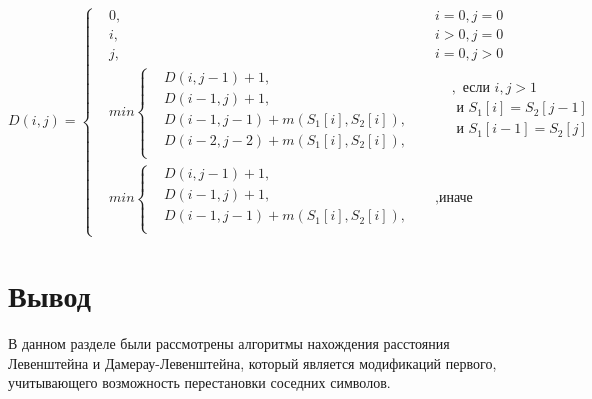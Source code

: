 \[ D(i, j) =  \left\{
    \begin{aligned}
        &0, && i = 0, j = 0\\
        &i, && i > 0, j = 0\\
        &j, && i = 0, j > 0\\
        &min \left\{
            \begin{aligned}
                &D(i, j - 1) + 1,\\
                &D(i - 1, j) + 1,\\
                &D(i - 1, j - 1) + m(S_{1}[i], S_{2}[i]), \\
                &D(i - 2, j - 2) + m(S_{1}[i], S_{2}[i]),\\
            \end{aligned} \right.
            &&
            \begin{aligned}
                &, \text{ если } i, j > 1 \\
                & \text{ и } S_{1}[i] = S_{2}[j - 1] \\
                & \text{ и } S_{1}[i - 1] =  S_{2}[j] \\
            \end{aligned} \\
            &min \left\{
                \begin{aligned}
                    &D(i, j - 1) + 1,\\
                    &D(i - 1, j) + 1, \\
                    &D(i - 1, j - 1) + m(S_{1}[i], S_{2}[i]),\\
                \end{aligned} \right.  &&, \text{иначе}
    \end{aligned} \right.
    \]

\section{Вывод}
В данном разделе были рассмотрены алгоритмы нахождения расстояния Левенштейна и Дамерау-Левенштейна, который является модификаций первого, учитывающего возможность перестановки соседних символов.
